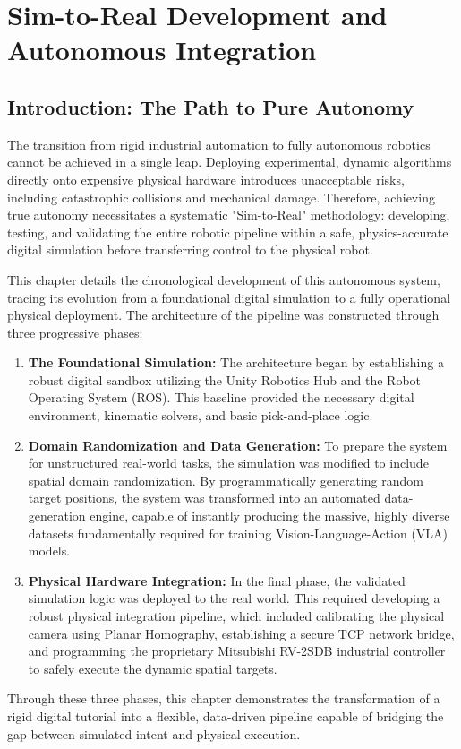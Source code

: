 \documentclass[a4paper, 12pt, twoside, openright]{book}
\begin{document}
\chapter{Sim-to-Real Development and Autonomous Integration} %
\thispagestyle{empty}

\section{Introduction: The Path to Pure Autonomy}

The transition from rigid industrial automation to fully autonomous robotics cannot be achieved in a single leap. Deploying experimental, dynamic algorithms directly onto expensive physical hardware introduces unacceptable risks, including catastrophic collisions and mechanical damage. Therefore, achieving true autonomy necessitates a systematic "Sim-to-Real" methodology: developing, testing, and validating the entire robotic pipeline within a safe, physics-accurate digital simulation before transferring control to the physical robot.

This chapter details the chronological development of this autonomous system, tracing its evolution from a foundational digital simulation to a fully operational physical deployment. The architecture of the pipeline was constructed through three progressive phases:

\begin{enumerate}
    \item \textbf{The Foundational Simulation:} The architecture began by establishing a robust digital sandbox utilizing the Unity Robotics Hub and the Robot Operating System (ROS). This baseline provided the necessary digital environment, kinematic solvers, and basic pick-and-place logic.
    \item \textbf{Domain Randomization and Data Generation:} To prepare the system for unstructured real-world tasks, the simulation was modified to include spatial domain randomization. By programmatically generating random target positions, the system was transformed into an automated data-generation engine, capable of instantly producing the massive, highly diverse datasets fundamentally required for training Vision-Language-Action (VLA) models.
    \item \textbf{Physical Hardware Integration:} In the final phase, the validated simulation logic was deployed to the real world. This required developing a robust physical integration pipeline, which included calibrating the physical camera using Planar Homography, establishing a secure TCP network bridge, and programming the proprietary Mitsubishi RV-2SDB industrial controller to safely execute the dynamic spatial targets.
\end{enumerate}

Through these three phases, this chapter demonstrates the transformation of a rigid digital tutorial into a flexible, data-driven pipeline capable of bridging the gap between simulated intent and physical execution.
\backmatter

\begingroup %
  \makeatletter
  \let\ps@plain\ps@empty
  \makeatother
  \printbibliography 
\endgroup
\end{document}
